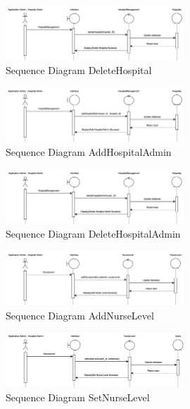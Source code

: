     \begin{figure}[h]
    \centering
    \includegraphics[width=0.6\textwidth]{Sequence 9.3.png}
    \caption{Sequence Diagram DeleteHospital}
    \end{figure}

    \begin{figure}[h]
    \centering
    \includegraphics[width=0.6\textwidth]{Sequence 9.4.png}
    \caption{Sequence Diagram AddHospitalAdmin}
    \end{figure}

    \begin{figure}[h]
    \centering
    \includegraphics[width=0.6\textwidth]{Sequence 9.5.png}
    \caption{Sequence Diagram DeleteHospitalAdmin}
    \end{figure}


\begin{figure}[h]
    \centering
    \includegraphics[width=0.6\textwidth]{Sequence 10.1.png}
    \caption{Sequence Diagram AddNurseLevel}
    \end{figure}

    \begin{figure}[h]
    \centering
    \includegraphics[width=0.6\textwidth]{Sequence 10.2.png}
    \caption{Sequence Diagram SetNurseLevel}
    \end{figure}

